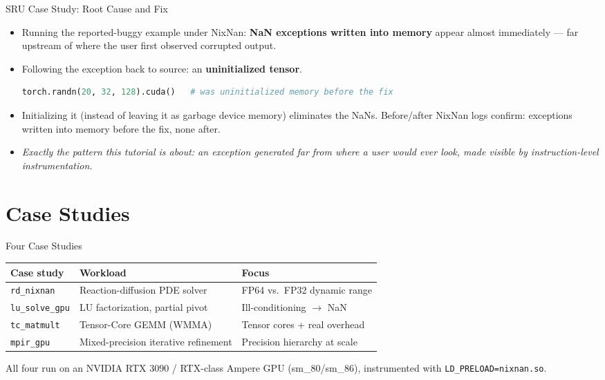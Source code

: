 \documentclass[aspectratio=169,11pt]{beamer}
\begin{document}
\begin{frame}[fragile]{SRU Case Study: Root Cause and Fix}
\begin{itemize}
  \item Running the reported-buggy example under NixNan: \textbf{NaN
    exceptions written into memory} appear almost immediately --- far
    upstream of where the user first observed corrupted output.
  \item Following the exception back to source: an \textbf{uninitialized
    tensor}.
\begin{lstlisting}[language=Python]
torch.randn(20, 32, 128).cuda()   # was uninitialized memory before the fix
\end{lstlisting}
  \item Initializing it (instead of leaving it as garbage device memory)
    eliminates the NaNs. Before/after NixNan logs confirm: exceptions
    written into memory before the fix, none after.
  \item \textit{Exactly the pattern this tutorial is about: an exception
    generated far from where a user would ever look, made visible by
    instruction-level instrumentation.}
\end{itemize}
\end{frame}

\section{Case Studies}

\begin{frame}{Four Case Studies}
\begin{center}
\begin{tabular}{lll}
\toprule
Case study & Workload & Focus \\
\midrule
\texttt{rd\_nixnan} & Reaction-diffusion PDE solver & FP64 vs.\ FP32 dynamic range \\
\texttt{lu\_solve\_gpu} & LU factorization, partial pivot & Ill-conditioning $\to$ NaN \\
\texttt{tc\_matmult} & Tensor-Core GEMM (WMMA) & Tensor cores + real overhead \\
\texttt{mpir\_gpu} & Mixed-precision iterative refinement & Precision hierarchy at scale \\
\bottomrule
\end{tabular}
\end{center}
\vspace{1em}
All four run on an NVIDIA RTX 3090 / RTX-class Ampere GPU (sm\_80/sm\_86),
instrumented with \texttt{LD\_PRELOAD=nixnan.so}.
\end{frame}
\end{document}
